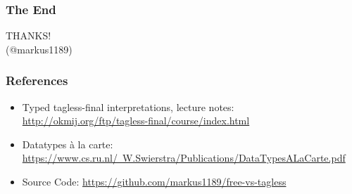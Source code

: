 \documentclass[aspectratio=169, hyperref={colorlinks, linkcolor=beamer@centricgreen}, urlcolor=links]{beamer}
\begin{document}
\begin{frame}
  \frametitle{The End}
  \begin{center}
    {
      \Huge
      THANKS!\\
    }
    \vfill
    (@markus1189)
  \end{center}
\end{frame}

\begin{frame}
  \frametitle{References}
  \begin{center}
    \begin{itemize}
    \item Typed tagless-final interpretations, lecture notes: \href{http://okmij.org/ftp/tagless-final/course/index.html}{http://okmij.org/ftp/tagless-final/course/index.html}
    \item Datatypes \`{a} la carte: \href{https://www.cs.ru.nl/~W.Swierstra/Publications/DataTypesALaCarte.pdf}{https://www.cs.ru.nl/~W.Swierstra/Publications/DataTypesALaCarte.pdf}
    \item Source Code: \href{https://github.com/markus1189/free-vs-tagless}{https://github.com/markus1189/free-vs-tagless}
    \end{itemize}
  \end{center}
\end{frame}

\appendix{}
\end{document}
